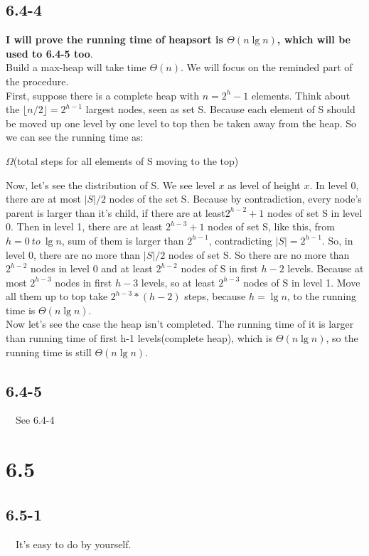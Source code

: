 \documentclass[10pt]{article}
\begin{document}
\subsection*{6.4-4}
\indent \textbf{I will prove the running time of heapsort is $\Theta(n\lg n)$, which will be used to 6.4-5 too}.\\
\indent Build a max-heap will take time $\Theta(n)$. We will focus on the reminded part of the procedure.\\
\indent First, suppose there is a complete heap with $n = 2^h - 1$ elements. Think about the $\lfloor {n/2} \rfloor = 2^{h-1}$ largest nodes, seen as set S. Because each element of S should be moved up one level by one level to top then be taken away from the heap. So we can see the running time as:
\begin{center}
  $\Omega$(total steps for all elements of S moving to the top)
\end{center}
Now, let's see the distribution of S. We see level $x$ as level of height $x$. In level 0, there are at most $|S|/2$ nodes of the set S. Because by contradiction, every node's parent is larger than it's child, if there are at least$2^{h-2}+1$ nodes of set S in level 0. Then in level 1, there are at least   $2^{h-3}+1$ nodes of set S, like this, from $h = 0 ~to~ \lg n$, sum of them is larger than $2^{h-1}$,  contradicting  $|S| = 2^{h-1}$. So, in level 0, there are no more than $|S|/2$ nodes of set S. So there are no more than $2^{h-2}$ nodes in level 0 and at least $2^{h-2}$ nodes of S in first $h-2$ levels. Because at most $2^{h-3}$ nodes in first $h-3$ levels, so at least $2^{h-3}$ nodes of S in level 1. Move all them up to top take $2^{h-3}*(h-2)$ steps, because $h=\lg n$, to the running time is $\Theta(n\lg n)$.\\
\indent Now let's see the case the heap isn't completed. The running time of it is larger than running time of first h-1 levels(complete heap), which is $\Theta(n\lg n)$, so the running time is still $\Theta(n\lg n)$.


\subsection*{6.4-5}
~~See 6.4-4

\section*{6.5}
\subsection*{6.5-1}
~~It's easy to do by yourself.
\end{document}
